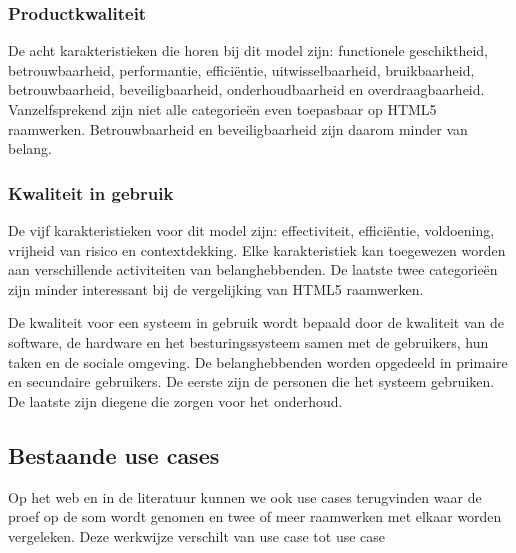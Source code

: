 
\subsubsection{Productkwaliteit}
De acht karakteristieken die horen bij dit model zijn: functionele geschiktheid,  betrouwbaarheid,  performantie, efficiëntie, uitwisselbaarheid,  bruikbaarheid,  betrouwbaarheid, beveiligbaarheid,  onderhoudbaarheid en overdraagbaarheid.   Vanzelfsprekend zijn niet alle categorieën even toepasbaar op HTML5 raamwerken.  Betrouwbaarheid en beveiligbaarheid zijn daarom minder van belang.

\subsubsection{Kwaliteit in gebruik}
De vijf karakteristieken voor dit model zijn: effectiviteit,  efficiëntie,  voldoening,  vrijheid van risico en contextdekking. Elke karakteristiek kan toegewezen worden aan verschillende activiteiten van belanghebbenden. De laatste twee categorieën zijn minder interessant bij de vergelijking van HTML5 raamwerken.

De kwaliteit voor een systeem in gebruik wordt bepaald door de kwaliteit van de software,  de hardware en het besturingssysteem samen met de gebruikers, hun taken en de sociale omgeving.  De belanghebbenden worden opgedeeld in primaire en secundaire gebruikers.  De eerste zijn de personen die het systeem gebruiken. De laatste zijn diegene die zorgen voor het onderhoud.

\subsection{Bestaande use cases}
Op het web en in de literatuur kunnen we ook use cases terugvinden waar de proef op de som wordt genomen en twee of meer raamwerken met elkaar worden vergeleken.  Deze werkwijze verschilt van use case tot use case

